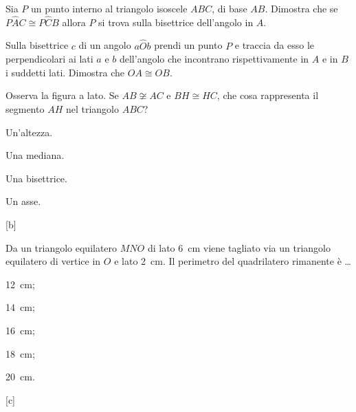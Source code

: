 \begin{multicols}{2}
\begin{esercizio}
\label{ese:2.81}
Sia \(P\) un punto interno al triangolo isoscele \(ABC\), di base \(AB\). 
Dimostra che se \(P\widehat{A}C\cong P\widehat{C}B\) allora \(P\) si 
trova sulla bisettrice dell'angolo in \(A\).
\end{esercizio}

\begin{esercizio}
\label{ese:2.89}
Sulla bisettrice \(c\) di un angolo \(a\widehat{O}b\) prendi un punto \(P\) 
e traccia da esso le perpendicolari ai lati \(a\) e \(b\) dell'angolo che 
incontrano rispettivamente in \(A\) e in \(B\) i suddetti lati. Dimostra 
che \(OA\cong OB\).
\end{esercizio}

\end{multicols}

\begin{esercizio}
\label{ese:2.99}
Osserva la figura a lato. Se \(AB\not\cong AC\) e \(BH\cong HC\), che 
cosa rappresenta il segmento \(AH\) nel triangolo \(ABC\)?\\
\begin{minipage}{.5\linewidth}
\begin{enumeratea}
\item Un'altezza.
\item Una mediana.
\item Una bisettrice.
\item Un asse.
\end{enumeratea}
\end{minipage}\hfil
\begin{minipage}{.2\linewidth}
  \centering
    
\end{minipage}
\hfill[b]
\end{esercizio}

\begin{esercizio}
\label{ese:2.100}
Da un triangolo equilatero \(MNO\) di lato 6~cm viene tagliato via un 
triangolo equilatero di vertice in \(O\) e lato 2~cm. Il perimetro del 
quadrilatero rimanente è \ldots
\begin{multicols}{5}
\begin{enumeratea}
\item 12~cm;
\item 14~cm;
\item 16~cm;
\item 18~cm;
\item 20~cm.
\end{enumeratea}
\end{multicols}
\hfill[c]
\end{esercizio}
